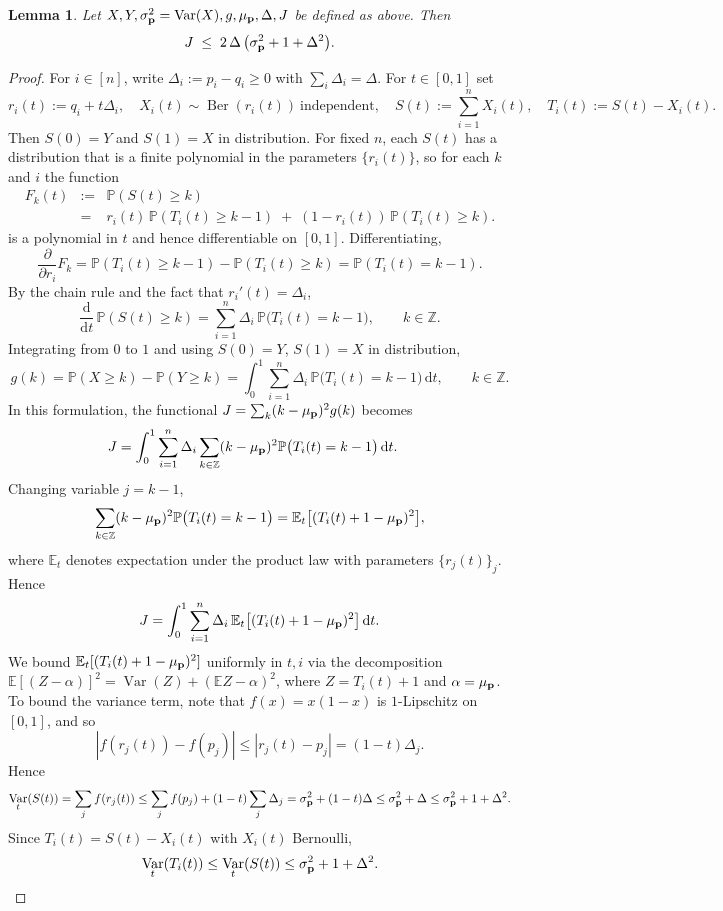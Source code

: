 \documentclass[11pt]{amsart}
\theoremstyle{plain}
\newtheorem{lemma}[theorem]{Lemma}
\theoremstyle{definition}
\DeclareMathOperator{\Ber}{Ber}
\DeclareMathOperator{\Var}{Var}
\newcommand{\E}{\mathbb{E}}
\renewcommand{\P}{\mathbb{P}}
\newcommand{\beq}{\begin{eqnarray*}}
\newcommand{\eeq}{\end{eqnarray*}}
\newcommand{\beqn}{\begin{eqnarray}}
\newcommand{\eeqn}{\end{eqnarray}}
\renewcommand{\vec}[1]{\textup{{\bf #1}}}
\begin{document}
\begin{lemma}
\label{lem:J-global}
Let $X,Y,\sigma_{\vec{p}}^2=\Var(X),g,\mu_{\vec{p}},\Delta,J$ be defined as above.
Then
\[
  J \;\le\;
2\,\Delta\,\bigl(\sigma_{\vec{p}}^2+1+\Delta^2\bigr).
\]
\end{lemma}

\begin{proof}
For $i\in[n]$,
write $\Delta_i:=p_i-q_i\ge0$ with $\sum_i\Delta_i=\Delta$. For
$t\in[0,1]$ set
\[
  r_i(t) := q_i + t\Delta_i,\quad
  X_i(t)\sim\Ber(r_i(t))\ \text{independent},\quad
  S(t):=\sum_{i=1}^n X_i(t),\quad
  T_i(t):=S(t)-X_i(t).
\]
Then $S(0)=Y$ and $S(1)=X$ in distribution. For fixed $n$, each
$S(t)$ has a distribution that is a finite polynomial in the parameters
$\{r_i(t)\}$, so for each $k$ and $i$ the function
\beq
F_k(t) &:=&
\P(S(t)\ge k) \\
&=&
r_i(t)\,\P(T_i(t)\ge k-1)\;+\;(1-r_i(t))\,\P(T_i(t)\ge k)
.
\eeq
is a polynomial in $t$ and hence differentiable on $[0,1]$.
Differentiating,
\[
  \frac{\partial}{\partial r_i}F_k
  = \P(T_i(t)\ge k-1)-\P(T_i(t)\ge k)
  = \P(T_i(t)=k-1).
\]
By the chain rule and the fact that $r_i'(t)=\Delta_i$,
\[
  \frac{\mathrm{d}}{\mathrm{d}t}\,\P(S(t)\ge k)
  = \sum_{i=1}^n \Delta_i\,\P\bigl(T_i(t)=k-1\bigr),
  \qquad k\in\mathbb Z.
\]
Integrating from $0$ to $1$ and using $S(0)=Y$,
$S(1)=X$ in distribution,
\[
  g(k)
  = \P(X\ge k)-\P(Y\ge k)
  = \int_0^1 \sum_{i=1}^n \Delta_i\,\P\bigl(T_i(t)=k-1\bigr)\,\mathrm{d}t,
  \qquad k\in\mathbb Z.
\]
In this formulation, the functional $J=\sum_k (k-\mu_{\vec{p}})^2 g(k)$
becomes
\begin{align*}
  J
  &= \int_0^1 \sum_{i=1}^n \Delta_i
       \sum_{k\in\mathbb Z} (k-\mu_{\vec{p}})^2 \P\bigl(T_i(t)=k-1\bigr)\,\mathrm{d}t.
\end{align*}
Changing variable $j=k-1$,
\[
  \sum_{k\in\mathbb Z} (k-\mu_{\vec{p}})^2 \P\bigl(T_i(t)=k-1\bigr)
  = \E_t\bigl[(T_i(t)+1-\mu_{\vec{p}})^2\bigr],
\]
where $\E_t$ denotes expectation under the product law with
parameters $\{r_j(t)\}_j$.
Hence
\begin{equation}\label{eq:J-Et}
  J
  = \int_0^1 \sum_{i=1}^n \Delta_i\,
       \E_t\bigl[(T_i(t)+1-\mu_{\vec{p}})^2\bigr]\,\mathrm{d}t.
\end{equation}
We bound $\E_t[(T_i(t)+1-\mu_{\vec{p}})^2]$ uniformly in $t,i$
via the decomposition
$\E[(Z-\alpha)]^2=\Var(Z)+(\E Z-\alpha)^2$,
where $Z=T_i(t)+1$ and $\alpha=\mu_{\vec{p}}$.
To bound the variance term, note that
$f(x)=x(1-x)$
is $1$-Lipschitz on $[0,1]$, and so
\[
  |f(r_j(t))-f(p_j)| \le |r_j(t)-p_j| = (1-t)\Delta_j.
\]
Hence
\[
  \Var_t(S(t))
  = \sum_j f(r_j(t))
  \le \sum_j f(p_j) + (1-t)\sum_j\Delta_j
  = \sigma_{\vec{p}}^2 + (1-t)\Delta
  \le \sigma_{\vec{p}}^2 + \Delta
  \le\sigma_{\vec{p}}^2 + 1 + \Delta^2.
\]
Since $T_i(t)=S(t)-X_i(t)$ with $X_i(t)$ Bernoulli,
\beqn
\label{eq:VarTi-bound}
  \Var_t(T_i(t))
  \le \Var_t(S(t))
  \le \sigma_{\vec{p}}^2 + 1 + \Delta^2.
\eeqn


\end{proof}
\end{document}
